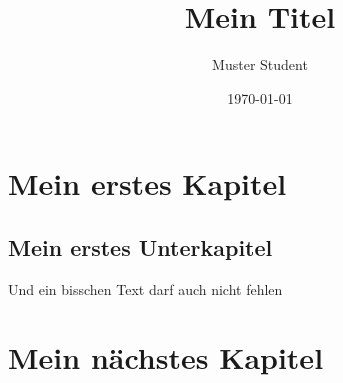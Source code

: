 \documentclass[12pt, titlepage]{scrbook}
\begin{document}
\subject{Master/Bachelorarbeit}
\title{Mein Titel}
\author{Muster Student}
\date{\today}
\publishers{\texttt{[image: UniLogo]}\vspace{\baselineskip}\\
Albert-Ludwigs-Universität Freiburg im Breisgau\\
Meine Fakultät\\
Institut für \LaTeX\vspace{-3cm}
}



\maketitle

\newpage

\tableofcontents

\newpage

\section{Mein erstes Kapitel}

\subsection{Mein erstes Unterkapitel}

Und ein bisschen Text darf auch nicht fehlen \cite{macklin2013position}

\section{Mein nächstes Kapitel}


\newpage


\end{document}
